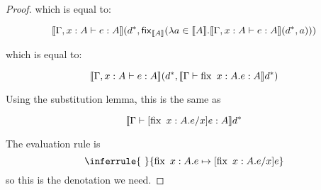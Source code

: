 \begin{proof}
which is equal to:

\[\llbracket \Gamma, x : A \vdash e : A \rrbracket(d^*, \operatorname{\mathsf{fix}}_{\llbracket A \rrbracket} (\lambda a \in \llbracket A \rrbracket . \llbracket \Gamma, x : A \vdash e : A \rrbracket(d^*, a)))
\]

which is equal to:

\[\llbracket \Gamma, x : A \vdash e : A \rrbracket(d^*, \llbracket \Gamma \vdash \operatorname{fix} \ x:A .e : A \rrbracket d^*)
\]

Using the substitution lemma, this is the same as

\[\llbracket \Gamma \vdash [\fix \ x:A.e/x] e : A \rrbracket d^* \]
 
 
The evaluation rule is 
$$
\inferrule{ \ }
{\fix \ x:A. e \mapsto [\fix \ x:A. e/x]e}
$$
so this is the denotation we need.
\end{proof}